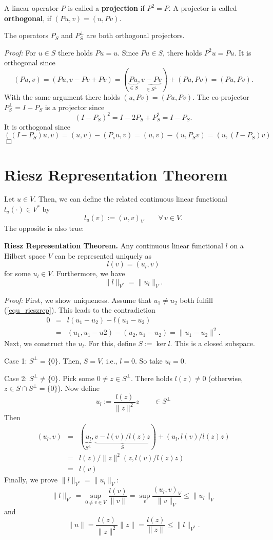 \begin{definition} A linear operator $P$ is called a {\bf projection} if $P^2 = P$.
A projector is called {\bf orthogonal}, if $(Pu,v) = (u,Pv)$.
\end{definition}
\begin{lemma} The operators $P_S$ and $P_S^\bot$ are both orthogonal 
projectors.
\end{lemma}
\noindent
{\em Proof:} For $u \in S$ there holds $P u = u$. Since $P u \in S$, there holds $P^2 u = P u$. It is orthogonal since
$$
(Pu,v) = (Pu,v-Pv+Pv) = (\underbrace{P u}_{\in S}, \underbrace{v-Pv}_{\in S^\bot}) + (Pu,Pv) = (Pu,Pv).
$$
With the same argument there holds $(u,Pv) = (Pu,Pv)$.
The co-projector $P_S^\bot = I - P_S$ is a projector since
$$
(I-P_S)^2 = I - 2 P_S + P_S^2 = I - P_S.
$$
It is orthogonal since $((I-P_S) u,v) = (u,v)-(P_su,v) =
        (u,v)-(u,P_Sv) = (u,(I-P_S)v)$
\hfill $\Box$

\section{Riesz Representation Theorem}
Let $u \in V$. Then, we can define the related continuous linear
functional~$l_u(\cdot) \in V^\ast$ by
$$
l_u (v) := (u,v)_V \qquad \forall \, v \in V.
$$
The opposite is also true:
\begin{theorem} {\bf Riesz Representation Theorem.} Any continuous linear
functional $l$ on a Hilbert space $V$ can be represented uniquely as
\begin{equation}
\label{equ_rieszrep}
l(v) = (u_l,v)
\end{equation}
for some $u_l \in V$. Furthermore, we have
$$
\| l \|_{V^\ast} = \| u_l \|_V.
$$
\end{theorem}
\noindent
{\em Proof:} First, we show uniqueness. Assume that $u_1 \neq u_2$ both
fulfill (\ref{equ_rieszrep}). This leads to the contradiction
\begin{eqnarray*}
0 & = & l(u_1-u_2) - l(u_1-u_2) \\
  & = & (u_1,u_1-u2) - (u_2,u_1-u_2) = \| u_1 - u_2 \|^2.
\end{eqnarray*}
Next, we construct the $u_l$. For this, define 
$S := \operatorname{ker} l$. This is a closed subspace. 

\noindent
Case 1: $S^\bot = \{ 0 \}$. Then, $S = V$, i.e., $l = 0$. So take $u_l = 0$.

\noindent
Case 2: $S^\bot \neq \{ 0 \}$. Pick some $0 \neq z \in S^\bot$. There
holds $l(z) \neq 0$ (otherwise, $z \in S \cap S^\bot = \{ 0 \}$).
Now define 
$$
u_l := \frac{l(z)}{\|z\|^2} z \qquad \in S^\bot
$$
Then
\begin{eqnarray*}
(u_l,v) & = & (\underbrace{u_l}_{S^\bot}, \underbrace{v - l(v)/l(z) z}_S) + (u_l,l(v)/l(z)z) \\
& = & l(z) / \| z\|^2 (z,l(v)/l(z) z) \\
& = & l(v)
\end{eqnarray*}
Finally, we prove $\|l\|_{V^\ast} = \| u_l \|_V$:
$$
\|l\|_{V^\ast} = \sup_{0 \neq v \in V} \frac{l(v)}{\|v\|}
        = \sup_v \frac{(u_l,v)_V}{\|v\|_V} \leq \| u_l \|_V
$$
and
$$
\| u \| = \frac{l(z)}{\|z\|^2}  \|z\| = \frac{l(z)}{\|z\|} \leq \| l \|_{V^\ast}.
$$


